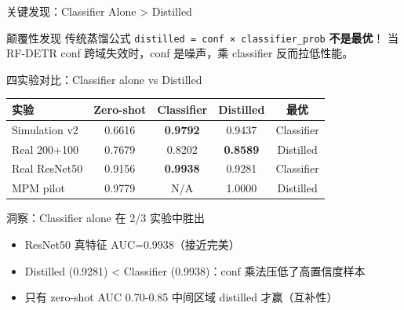 \documentclass[aspectratio=169, 10pt]{beamer}
\begin{document}
\begin{frame}{关键发现：Classifier Alone > Distilled}
  \begin{alertblock}{颠覆性发现}
    传统蒸馏公式 \texttt{distilled = conf × classifier\_prob} \textbf{不是最优}！
    当 RF-DETR conf 跨域失效时，conf 是噪声，乘 classifier 反而拉低性能。
  \end{alertblock}
  \vspace{-0.3em}
  \begin{block}{四实验对比：Classifier alone vs Distilled}
    \centering
    \small
    \begin{tabular}{lcccc}
      \toprule
      \textbf{实验} & \textbf{Zero-shot} & \textbf{Classifier} & \textbf{Distilled} & \textbf{最优} \\
      \midrule
      Simulation v2 & 0.6616 & \textcolor{mygreen}{\textbf{0.9792}} & 0.9437 & Classifier \\
      Real 200+100 & 0.7679 & 0.8202 & \textcolor{mygreen}{\textbf{0.8589}} & Distilled \\
      Real ResNet50 & 0.9156 & \textcolor{mygreen}{\textbf{0.9938}} & 0.9281 & Classifier \\
      MPM pilot & 0.9779 & N/A & 1.0000 & Distilled \\
      \bottomrule
    \end{tabular}
  \end{block}
  \vspace{-0.3em}
  \begin{block}{洞察：Classifier alone 在 2/3 实验中胜出}
    \begin{itemize}
      \item ResNet50 真特征 AUC=0.9938（接近完美）
      \item Distilled (0.9281) < Classifier (0.9938)：conf 乘法压低了高置信度样本
      \item 只有 zero-shot AUC 0.70-0.85 中间区域 distilled 才赢（互补性）
    \end{itemize}
  \end{block}
\end{frame}
\end{document}
